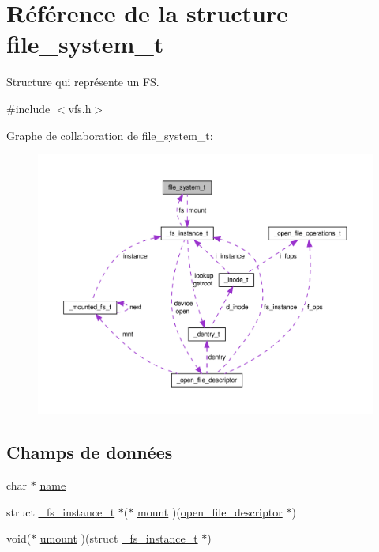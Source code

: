 \hypertarget{structfile__system__t}{\section{\-Référence de la structure file\-\_\-system\-\_\-t}
\label{structfile__system__t}
}


\-Structure qui représente un \-F\-S.  




{\ttfamily \#include $<$vfs.\-h$>$}



\-Graphe de collaboration de file\-\_\-system\-\_\-t\-:\nopagebreak
\begin{figure}[H]
\begin{center}
\leavevmode
\includegraphics[width=350pt]{structfile__system__t__coll__graph}
\end{center}
\end{figure}
\subsection*{\-Champs de données}
\begin{DoxyCompactItemize}
\item 
char $\ast$ \hyperlink{structfile__system__t_a2b7d7c0f769113d1164052beeeca777d}{name}
\item 
struct \hyperlink{struct__fs__instance__t}{\-\_\-fs\-\_\-instance\-\_\-t} $\ast$($\ast$ \hyperlink{structfile__system__t_a7edaed95e6ac68991bbaac6cd07b458b}{mount} )(\hyperlink{struct__open__file__descriptor}{open\-\_\-file\-\_\-descriptor} $\ast$)
\item 
void($\ast$ \hyperlink{structfile__system__t_a899f34d838d88470373b60f7c5f0edd9}{umount} )(struct \hyperlink{struct__fs__instance__t}{\-\_\-fs\-\_\-instance\-\_\-t} $\ast$)
\end{DoxyCompactItemize}


